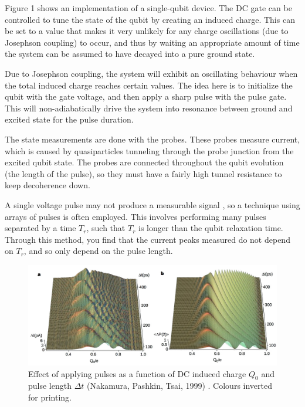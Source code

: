 \documentclass[12pt,letterpaper,notitlepage]{report}
\begin{document}
Figure 1 shows an implementation of a single-qubit device. The DC gate can be controlled to tune the state of the qubit by creating an induced charge. This can be set to a value that makes it very unlikely for any charge oscillations (due to Josephson coupling) to occur, and thus by waiting an appropriate amount of time the system can be assumed to have decayed into a pure ground state.

Due to Josephson coupling, the system will exhibit an oscillating behaviour when the total induced charge reaches certain values. The idea here is to initialize the qubit with the gate voltage, and then apply a sharp pulse with the pulse gate. This will non-adiabatically drive the system into resonance between ground and excited state for the pulse duration.

The state measurements are done with the probes. These probes measure current, which is caused by quasiparticles tunneling through the probe junction from the excited qubit state. The probes are connected throughout the qubit evolution (the length of the pulse), so they must have a fairly high tunnel resistance to keep decoherence down.

A single voltage pulse may not produce a measurable signal \cite{singleCPB}, so a technique using arrays of pulses is often employed. This involves performing many pulses separated by a time $T_r$, such that $T_r$ is longer than the qubit relaxation time. Through this method, you find that the current peaks measured do not depend on $T_r$, and so only depend on the pulse length.

\begin{figure}[ht]
    \centering
    \includegraphics[width=\textwidth]{img/nakamura-pulse-response.jpg}
    \caption{Effect of applying pulses as a function of DC induced charge $Q_0$ and pulse length $\Delta t$ (Nakamura, Pashkin, Tsai, 1999) \cite{singleCPB}. Colours inverted for printing.}
\end{figure}
\end{document}
